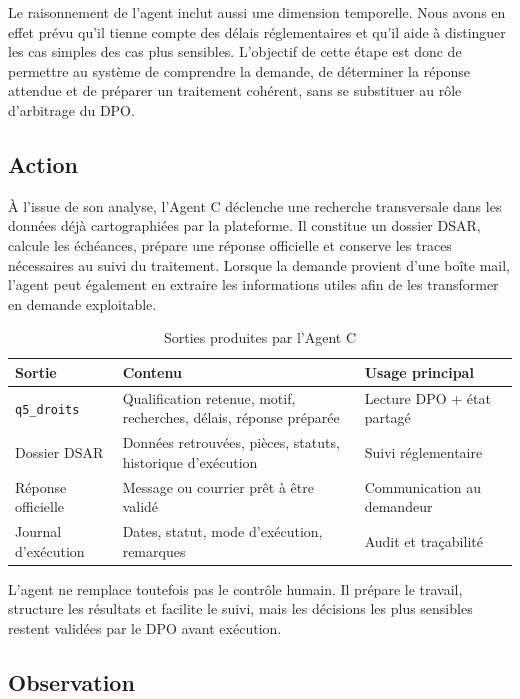 \documentclass[12pt,a4paper]{report}
\begin{document}
Le raisonnement de l'agent inclut aussi une dimension temporelle. Nous avons en effet prévu qu'il tienne compte des délais réglementaires et qu'il aide à distinguer les cas simples des cas plus sensibles. L'objectif de cette étape est donc de permettre au système de comprendre la demande, de déterminer la réponse attendue et de préparer un traitement cohérent, sans se substituer au rôle d'arbitrage du DPO.

\subsection{Action}

À l'issue de son analyse, l'Agent C déclenche une recherche transversale dans les données déjà cartographiées par la plateforme. Il constitue un dossier DSAR, calcule les échéances, prépare une réponse officielle et conserve les traces nécessaires au suivi du traitement. Lorsque la demande provient d'une boîte mail, l'agent peut également en extraire les informations utiles afin de les transformer en demande exploitable.

\begin{table}[H]
\centering
\caption{Sorties produites par l'Agent C}
\label{tab:outputs_agent_c}
\begin{tabularx}{\textwidth}{|p{3cm}|X|p{3.2cm}|}
\hline
\textbf{Sortie} & \textbf{Contenu} & \textbf{Usage principal} \\
\hline
\texttt{q5\_droits} & Qualification retenue, motif, recherches, délais, réponse préparée & Lecture DPO + état partagé \\
\hline
Dossier DSAR & Données retrouvées, pièces, statuts, historique d'exécution & Suivi réglementaire \\
\hline
Réponse officielle & Message ou courrier prêt à être validé & Communication au demandeur \\
\hline
Journal d'exécution & Dates, statut, mode d'exécution, remarques & Audit et traçabilité \\
\hline
\end{tabularx}
\end{table}

L'agent ne remplace toutefois pas le contrôle humain. Il prépare le travail, structure les résultats et facilite le suivi, mais les décisions les plus sensibles restent validées par le DPO avant exécution.

\subsection{Observation}
\end{document}
